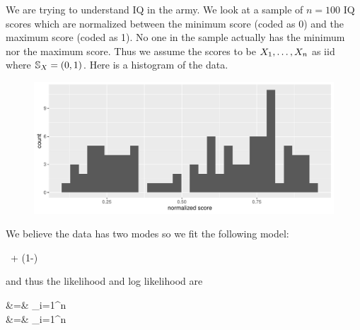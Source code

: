 \documentclass[12pt]{article}
\begin{document}
\problem We are trying to understand IQ in the army. We look at a sample of $n=100$ IQ scores which are normalized between the minimum score (coded as 0) and the maximum score (coded as 1). No one in the sample actually has the minimum nor the maximum score. Thus we assume the scores to be $X_1, \ldots, X_n$ as iid where $\mathbb{S}_{X} = (0,1)$. Here is a histogram of the data.

\begin{figure}[htp]
\centering
\includegraphics[width=5.5in]{hist}
\end{figure}

\noindent We believe the data has two modes so we fit the following model:

\beqn
\Xoneton \iid \theta \, + (1-\theta) \,
\eeqn 

\noindent and thus the likelihood and log likelihood are

\beqn
{} &=& \prod_{i=1}^n  \\
\ell &=& \sum_{i=1}^n 
\eeqn
\end{document}
